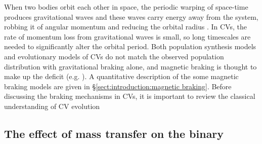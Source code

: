 When two bodies orbit each other in space, the periodic warping of space-time produces gravitational waves \citep{einstein1918} and these waves carry energy away from the system, robbing it of angular momentum and reducing the orbital radius \citep{Paczynski1967}. In CVs, the rate of momentum loss from gravitational waves is small, so long timescales are needed to significantly alter the orbital period.
Both population synthesis models and evolutionary models of CVs do not match the observed population distribution with gravitational braking alone, and magnetic braking is thought to make up the deficit (e.g. \citet{kolb1993a, kolb1993, Davis2008, garraffo2018b}).
A quantitative description of the some magnetic braking models are given in \S\ref{sect:introduction:magnetic braking}. Before discussing the braking mechanisms in CVs, it is important to review the classical understanding of CV evolution


\subsection{The effect of mass transfer on the binary}
\label{sect:introduction:stability criterion}


